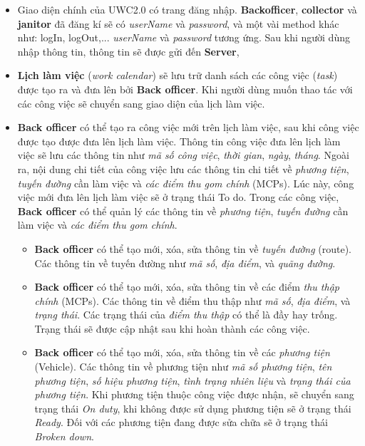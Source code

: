\documentclass[a4paper]{article}
\begin{document}
\begin{itemize}
    \item Giao diện chính của UWC2.0 có trang đăng nhập. \textbf{Backofficer},  \textbf{collector} và  \textbf{janitor} đã đăng kí sẽ có \textit{userName} và \textit{password}, và một vài method khác như: logIn, logOut,...
     \textit{userName} và \textit{password} tương ứng. Sau khi người dùng nhập thông tin, thông tin sẽ được gửi đến \textbf{Server},
    \item \textbf{Lịch làm việc} (\textit{work calendar}) sẽ lưu trữ danh sách các công việc (\textit{task}) được tạo ra và đưa lên bởi \textbf{Back officer}. Khi người dùng muốn thao tác với các công việc sẽ chuyển sang giao diện của lịch làm việc.
    \item \textbf{Back officer} có thể tạo ra công việc mới trên lịch làm việc, sau khi công việc được tạo được đưa lên lịch làm việc.
    Thông tin công việc đưa lên lịch làm việc sẽ lưu các thông tin như \textit{mã số công việc}, \textit{thời gian}, \textit{ngày}, \textit{tháng}. Ngoài ra, nội dung chi tiết của công việc lưu các thông tin chi tiết về \textit{
phương tiện}, \textit{tuyến đường} cần làm việc và \textit{các điểm thu gom chính} (MCPs). Lúc này, công việc mới đưa lên lịch làm việc sẽ ở trạng thái To do. Trong các công việc, \textbf{Back officer} có thể quản lý các thông tin về \textit{
phương tiện}, \textit{tuyến đường} cần làm việc và \textit{các điểm thu gom chính}.
    \begin{itemize}
        \item \textbf{Back officer} có thể tạo mới, xóa, sửa thông tin về \textit{tuyến đường} (route). Các thông tin về tuyến đường như \textit{mã số}, \textit{địa điểm}, và \textit{quãng đường}.
        \item \textbf{Back officer} có thể tạo mới, xóa, sửa thông tin về các điểm \textit{thu thập chính} (MCPs). Các thông tin về điểm thu thập như \textit{mã số}, \textit{địa điểm}, và \textit{trạng thái}. Các trạng thái của \textit{điểm thu thập} có thể là đầy hay trống. Trạng thái sẽ được cập nhật sau khi hoàn thành các công việc.
        \item \textbf{Back officer} có thể tạo mới, xóa, sửa thông tin về các \textit{phương tiện} (Vehicle). Các thông tin về phương tiện như \textit{mã số phương tiện}, \textit{tên phương tiện}, \textit{số hiệu phương tiện}, \textit{tình trạng nhiên liệu} và \textit{trạng thái của phương tiện}. Khi phương tiện thuộc công việc được nhận, sẽ chuyển sang trạng thái \textit{On duty}, khi không được sử dụng phương tiện sẽ ở trạng thái \textit{Ready}. Đối với các phương tiện đang được sửa chữa sẽ ở trạng thái \textit{Broken down}.

\end{itemize}
\end{itemize}
\end{document}
